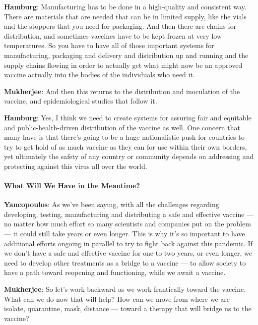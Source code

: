 \textbf{Hamburg}: Manufacturing has to be done in a high-quality and
consistent way. There are materials that are needed that can be in
limited supply, like the vials and the stoppers that you need for
packaging. And then there are chains for distribution, and sometimes
vaccines have to be kept frozen at very low temperatures. So you have to
have all of those important systems for manufacturing, packaging and
delivery and distribution up and running and the supply chains flowing
in order to actually get what might now be an approved vaccine actually
into the bodies of the individuals who need it.

\textbf{Mukherjee}: And then this returns to the distribution and
inoculation of the vaccine, and epidemiological studies that follow it.

\textbf{Hamburg}: Yes, I think we need to create systems for assuring
fair and equitable and public-health-driven distribution of the vaccine
as well. One concern that many have is that there's going to be a huge
nationalistic push for countries to try to get hold of as much vaccine
as they can for use within their own borders, yet ultimately the safety
of any country or community depends on addressing and protecting against
this virus all over the world.

\hypertarget{what-will-we-have-in-the-meantime}{%
\paragraph{What Will We Have in the
Meantime?}\label{what-will-we-have-in-the-meantime}}

\textbf{Yancopoulos}: As we've been saying, with all the challenges
regarding developing, testing, manufacturing and distributing a safe and
effective vaccine --- no matter how much effort so many scientists and
companies put on the problem --- it could still take years or even
longer. This is why it's so important to have additional efforts ongoing
in parallel to try to fight back against this pandemic. If we don't have
a safe and effective vaccine for one to two years, or even longer, we
need to develop other treatments as a bridge to a vaccine --- to allow
society to have a path toward reopening and functioning, while we await
a vaccine.

\textbf{Mukherjee}: So let's work backward as we work frantically toward
the vaccine. What can we do now that will help? How can we move from
where we are --- isolate, quarantine, mask, distance --- toward a
therapy that will bridge us to the vaccine?

